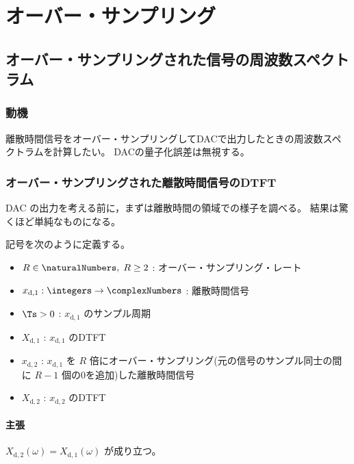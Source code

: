 \chapter{オーバー・サンプリング}
    \section{オーバー・サンプリングされた信号の周波数スペクトラム}
        \newcommand{\xda}{x_{\text{d},1}}
        \newcommand{\Xda}{X_{\text{d},1}}
        \newcommand{\xdb}{x_{\text{d},2}}
        \newcommand{\Xdb}{X_{\text{d},2}}
        \subsection{動機}
            離散時間信号をオーバー・サンプリングしてDACで出力したときの周波数スペクトラムを計算したい。
            DACの量子化誤差は無視する。
        \subsection{オーバー・サンプリングされた離散時間信号のDTFT}
            DAC の出力を考える前に，まずは離散時間の領域での様子を調べる。
            結果は驚くほど単純なものになる。
            \par
            記号を次のように定義する。
            \begin{itemize}
                \item $R\in\naturalNumbers,\;R\geq 2$ : オーバー・サンプリング・レート
                \item $\xda:\integers\to\complexNumbers$ : 離散時間信号
                \item $\Ts>0$ : $\xda$ のサンプル周期
                \item $\Xda$ : $\xda$ のDTFT
                \item $\xdb$ : $\xda$ を $R$ 倍にオーバー・サンプリング(元の信号のサンプル同士の間に $R-1$ 個の0を追加)した離散時間信号
                \item $\Xdb$ : $\xdb$ のDTFT
            \end{itemize}
            \subsubsection{主張}
                $\Xdb(\omega) = \Xda(\omega)$ が成り立つ。
